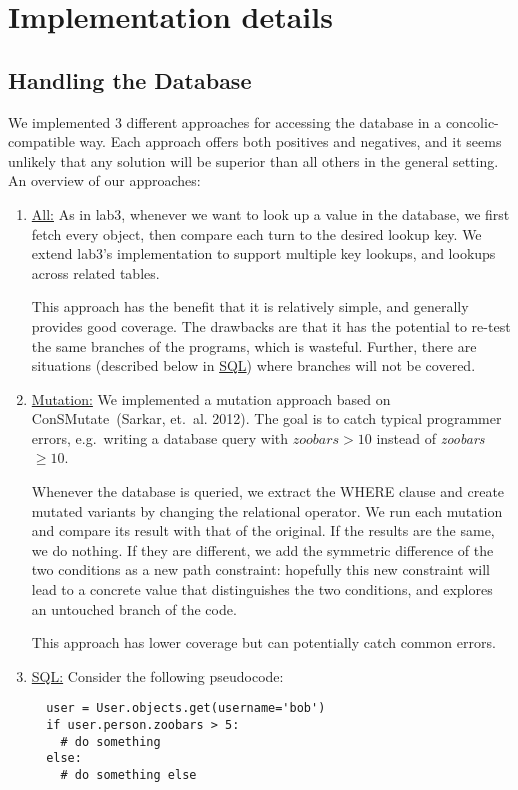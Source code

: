 \documentclass{scrartcl}
\begin{document}
\section{Implementation details}

\subsection{Handling the Database}
We implemented 3 different approaches for accessing the database in a
concolic-compatible way. Each approach offers both positives and
negatives, and it seems unlikely that any solution will be superior
than all others in the general setting. An overview of our approaches:

\begin{enumerate}
\item \underline{All:}
  As in lab3, whenever we want to look up a value in the database, we
  first fetch every object, then compare each turn to the desired
  lookup key. We extend lab3's implementation to support multiple key
  lookups, and lookups across related tables.

  This approach has the benefit that it is relatively simple, and
  generally provides good coverage. The drawbacks are that it has the
  potential to re-test the same branches of the programs, which is
  wasteful. Further, there are situations (described below in
  \underline{SQL}) where branches will not be covered.

\item \underline{Mutation:}
  We implemented a mutation approach based on
  ConSMutate~(Sarkar, et.\ al. 2012). The goal is to catch typical
  programmer errors, e.g.\ writing a database query with
  $\textit{zoobars} > 10$ instead of \textit{zoobars }$ \geq 10$.

  Whenever the database is queried, we extract the WHERE clause and
  create mutated variants by changing the relational operator. We run
  each mutation and compare its result with that of the original. If
  the results are the same, we do nothing. If they are different, we
  add the symmetric difference of the two conditions as a new path
  constraint: hopefully this new constraint will lead to a concrete
  value that distinguishes the two conditions, and explores an
  untouched branch of the code.

  This approach has lower coverage but can potentially catch common errors.

\item \underline{SQL:}
  Consider the following pseudocode:
  \begin{verbatim}
  user = User.objects.get(username='bob')
  if user.person.zoobars > 5:
    # do something
  else:
    # do something else
  \end{verbatim}


\end{enumerate}
\end{document}
